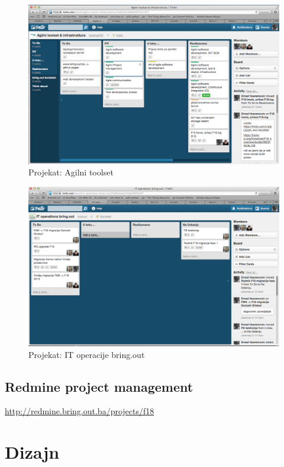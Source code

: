 \documentclass[times, utf8, seminar]{fit}
\begin{document}
\begin{figure}[H]
\centering
\includegraphics[width=14cm]{img/trello_agile.png}
\caption{Projekat: Agilni toolset}
\end{figure}

\begin{figure}[H]
\centering
\includegraphics[width=14cm]{img/trello_ops.png}
\caption{Projekat: IT operacije bring.out}
\end{figure}

\section{Redmine project management}

\url{http://redmine.bring.out.ba/projects/f18} 

\chapter{Dizajn}
\end{document}
